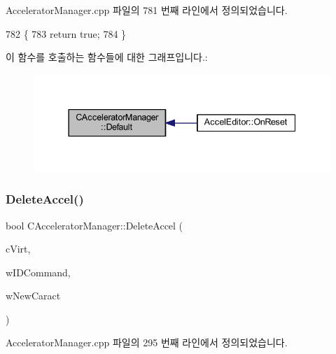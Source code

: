 Accelerator\+Manager.\+cpp 파일의 781 번째 라인에서 정의되었습니다.


\begin{DoxyCode}
782 \{
783   \textcolor{keywordflow}{return} \textcolor{keyword}{true};
784 \}
\end{DoxyCode}
이 함수를 호출하는 함수들에 대한 그래프입니다.\+:
\nopagebreak
\begin{figure}[H]
\begin{center}
\leavevmode
\includegraphics[width=337pt]{class_c_accelerator_manager_aa510a36964ed209de5f7325efa713bf6_icgraph}
\end{center}
\end{figure}
\mbox{\label{class_c_accelerator_manager_a73426e98a7fb4d8e5481a8e55a8a2626}} 
\subsubsection{\texorpdfstring{Delete\+Accel()}{DeleteAccel()}}
{\footnotesize\ttfamily bool C\+Accelerator\+Manager\+::\+Delete\+Accel (\begin{DoxyParamCaption}\item[{B\+Y\+TE}]{c\+Virt,  }\item[{W\+O\+RD}]{w\+I\+D\+Command,  }\item[{W\+O\+RD}]{w\+New\+Caract }\end{DoxyParamCaption})}



Accelerator\+Manager.\+cpp 파일의 295 번째 라인에서 정의되었습니다.


